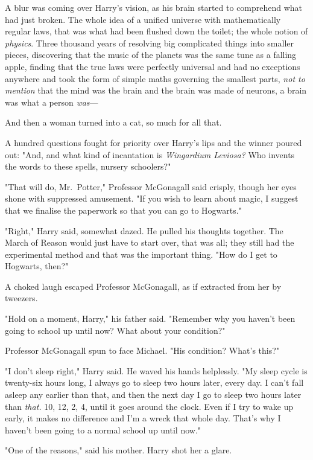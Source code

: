 A blur was coming over Harry's vision, as his brain started to comprehend what 
had just broken. The whole idea of a unified universe with mathematically 
regular laws, that was what had been flushed down the toilet; the whole notion 
of \emph{physics}. Three thousand years of resolving big complicated things 
into smaller pieces, discovering that the music of the planets was the same 
tune as a falling apple, finding that the true laws were perfectly universal 
and had no exceptions anywhere and took the form of simple maths governing the 
smallest parts, \emph{not to mention} that the mind was the brain and the brain 
was made of neurons, a brain was what a person \emph{was}---

And then a woman turned into a cat, so much for all that.

A hundred questions fought for priority over Harry's lips and the winner poured 
out: "And, and what kind of incantation is \emph{Wingardium Leviosa?} Who 
invents the words to these spells, nursery schoolers?"

"That will do, Mr.~Potter," Professor McGonagall said crisply, though her eyes 
shone with suppressed amusement. "If you wish to learn about magic, I suggest 
that we finalise the paperwork so that you can go to Hogwarts."

"Right," Harry said, somewhat dazed. He pulled his thoughts together. The March 
of Reason would just have to start over, that was all; they still had the 
experimental method and that was the important thing. "How do I get to 
Hogwarts, then?"

A choked laugh escaped Professor McGonagall, as if extracted from her by 
tweezers.

"Hold on a moment, Harry," his father said. "Remember why you haven't been 
going to school up until now? What about your condition?"

Professor McGonagall spun to face Michael. "His condition? What's this?"

"I don't sleep right," Harry said. He waved his hands helplessly. "My sleep 
cycle is twenty-six hours long, I always go to sleep two hours later, every 
day. I can't fall asleep any earlier than that, and then the next day I go to 
sleep two hours later than \emph{that.} 10\PM, 12\AM, 2\AM, 4\AM, until it goes 
around the clock. Even if I try to wake up early, it makes no difference and 
I'm a wreck that whole day. That's why I haven't been going to a normal school 
up until now."

"One of the reasons," said his mother. Harry shot her a glare.

